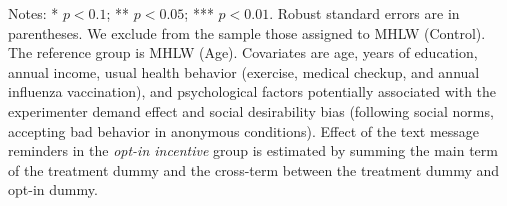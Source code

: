 \documentclass[
]{article}
\begin{document}
\begin{table}
\begin{threeparttable}
\begin{tabular}[t]{lcccc}
\bottomrule
\end{tabular}
\begin{tablenotes}
\item Notes: * $p < 0.1$; ** $p < 0.05$; *** $p < 0.01$. Robust standard errors are in parentheses. We exclude from the sample those assigned to MHLW (Control). The reference group is MHLW (Age). Covariates are age, years of education, annual income, usual health behavior (exercise, medical checkup, and annual influenza vaccination), and psychological factors potentially associated with the experimenter demand effect and social desirability bias (following social norms, accepting bad behavior in anonymous conditions). Effect of the text message reminders in the \emph{opt-in incentive} group is estimated by summing the main term of the treatment dummy and the cross-term between the treatment dummy and opt-in dummy.
\end{tablenotes}
\end{threeparttable}
\end{table}
\end{document}
